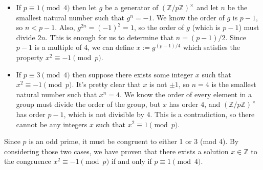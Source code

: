 \documentclass[12pt]{article}
\begin{document}
\begin{itemize}
    \item If $p \equiv 1 \pmod{4}$ then let $g$ be a generator of $(\mathbb{Z}/p\mathbb{Z})^\times$ and let $n$ be the smallest natural number such that $g^n = -1$. We know the order of $g$ is $p-1$, so $n < p-1$. Also, $g^{2n}=(-1)^2=1$, so the order of $g$ (which is $p-1$) must divide $2n$. This is enough for us to determine that $n=(p-1)/2$. Since $p-1$ is a multiple of 4, we can define $x := g^{(p-1)/4}$ which satisfies the property $x^2 \equiv -1 \pmod{p}$.
    \item If $p \equiv 3 \pmod{4}$ then suppose there exists some integer $x$ such that $x^2 \equiv -1 \pmod{p}$. It's pretty clear that $x$ is not $\pm 1$, so $n=4$ is the smallest natural number such that $x^n=4$. We know the order of every element in a group must divide the order of the group, but $x$ has order $4$, and $(\mathbb{Z}/p\mathbb{Z})^\times$ has order $p-1$, which is not divisible by 4. This is a contradiction, so there cannot be any integers $x$ such that $x^2 \equiv 1 \pmod{p}$.
\end{itemize}

Since $p$ is an odd prime, it must be congruent to either 1 or 3 (mod 4). By considering those two cases, we have proven that there exists a solution $x \in \mathbb{Z}$ to the congruence $x^2 \equiv -1 \pmod{p}$ if and only if $p \equiv 1 \pmod{4}$.

\section{}
\noindent{}\bigskip
\end{document}
